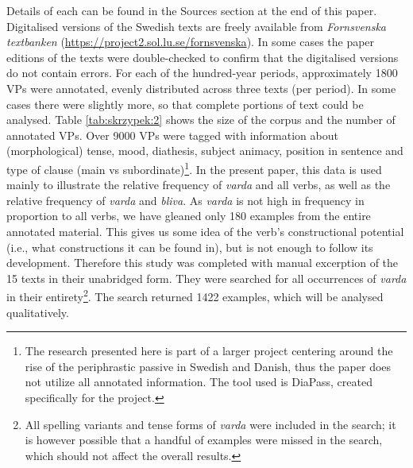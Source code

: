 \documentclass[output=paper,colorlinks,citecolor=brown]{langscibook}
\begin{document}
Details of each can be found in the Sources section at the end of this paper. Digitalised versions of the Swedish texts are freely available from \textit{Fornsvenska textbanken }(\href{https://project2.sol.lu.se/fornsvenska/}{https://project2.sol.lu.se/fornsvenska}). In some cases the paper editions of the texts were double-checked to confirm that the digitalised versions do not contain errors. For each of the hundred-year periods, approximately 1800 VPs were annotated, evenly distributed across three texts (per period). In some cases there were slightly more, so that complete portions of text could be analysed. Table \ref{tab:skrzypek:2} shows the size of the corpus and the number of annotated VPs. Over 9000 VPs were tagged with information about (morphological) tense, mood, diathesis, subject animacy, position in sentence and type of clause (main vs subordinate)\footnote{The research presented here is part of a larger project centering around the rise of the periphrastic passive in Swedish and Danish, thus the paper does not utilize all annotated information. The tool used is DiaPass, created specifically for the project.}. In the present paper, this data is used mainly to illustrate the relative frequency of \textit{varda} and all verbs, as well as the relative frequency of \textit{varda} and \textit{bliva}. As \textit{varda} is not high in frequency in proportion to all verbs, we have gleaned only 180 examples from the entire annotated material. This gives us some idea of the verb’s constructional potential (i.e., what constructions it can be found in), but is not enough to follow its development. Therefore this study was completed with manual excerption of the 15 texts in their unabridged form. They were searched for all occurrences of \textit{varda} in their entirety\footnote{All spelling variants and tense forms of \textit{varda} were included in the search; it is however possible that a handful of examples were missed in the search, which should not affect the overall results.}. The search returned 1422 examples, which will be analysed qualitatively. 

\largerpage[1]
\newpage
\end{document}
